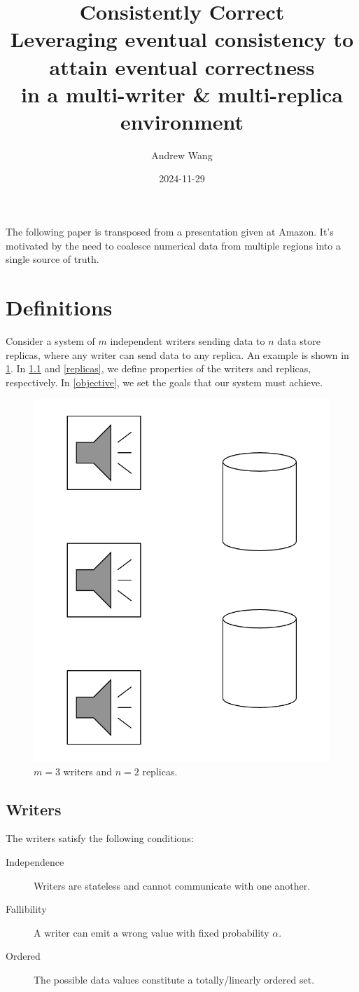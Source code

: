 \documentclass[12pt]{article}
\title{
  Consistently Correct \\
  \large Leveraging eventual consistency to attain eventual correctness \\ in a multi-writer \& multi-replica environment
}
\author{Andrew Wang}
\date{2024-11-29}
\begin{document}
\maketitle
The following paper is transposed from a presentation given at Amazon. It's motivated by the need to coalesce numerical data from multiple regions into a single source of truth.
\tableofcontents

\section{Definitions}

Consider a system of \(m\) independent writers sending data to \(n\) data store replicas, where any writer can send data to any replica. An example is shown in \cref{scenario_img}. In \cref{writers} and \cref{replicas}, we define properties of the writers and replicas, respectively. In \cref{objective}, we set the goals that our system must achieve.

\begin{figure}[htbp]
	\centering
	\includegraphics[width=.45\textwidth]{objective.png}
	\caption{\(m=3\) writers and \(n=2\) replicas.}
	\label{scenario_img}
\end{figure}

\subsection{Writers} \label{writers}

The writers satisfy the following conditions:
\begin{description}
	\item[Independence] Writers are stateless and cannot communicate with one another.

	\item[Fallibility] A writer can emit a wrong value with fixed probability \(\alpha\).

	\item[Ordered] The possible data values constitute a totally/linearly ordered set.
\end{description}
\end{document}
